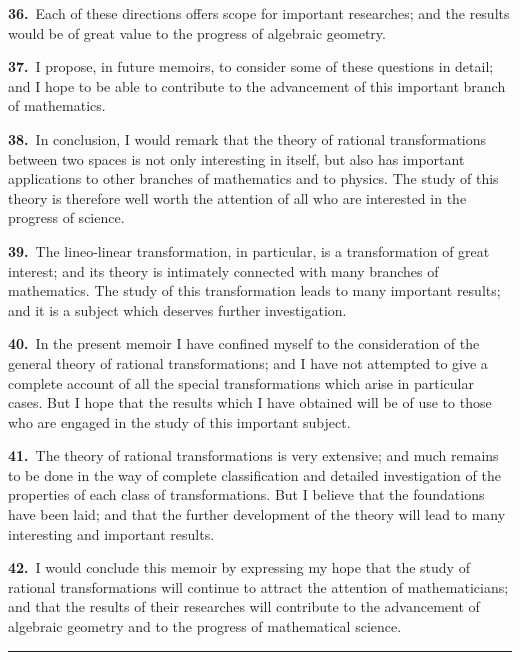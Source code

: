 \documentclass[11pt,a4paper]{article}
\begin{document}
\textbf{36.}\ Each of these directions offers scope for important researches; and the results would be of great value to the progress of algebraic geometry.

\newpage
\setcounter{page}{199}

\noindent\textbf{37.}\ I propose, in future memoirs, to consider some of these questions in detail; and I hope to be able to contribute to the advancement of this important branch of mathematics.

\textbf{38.}\ In conclusion, I would remark that the theory of rational transformations between two spaces is not only interesting in itself, but also has important applications to other branches of mathematics and to physics. The study of this theory is therefore well worth the attention of all who are interested in the progress of science.

\textbf{39.}\ The lineo-linear transformation, in particular, is a transformation of great interest; and its theory is intimately connected with many branches of mathematics. The study of this transformation leads to many important results; and it is a subject which deserves further investigation.

\textbf{40.}\ In the present memoir I have confined myself to the consideration of the general theory of rational transformations; and I have not attempted to give a complete account of all the special transformations which arise in particular cases. But I hope that the results which I have obtained will be of use to those who are engaged in the study of this important subject.

\newpage
\setcounter{page}{200}

\noindent\textbf{41.}\ The theory of rational transformations is very extensive; and much remains to be done in the way of complete classification and detailed investigation of the properties of each class of transformations. But I believe that the foundations have been laid; and that the further development of the theory will lead to many interesting and important results.

\textbf{42.}\ I would conclude this memoir by expressing my hope that the study of rational transformations will continue to attract the attention of mathematicians; and that the results of their researches will contribute to the advancement of algebraic geometry and to the progress of mathematical science.

\vspace{2em}
\begin{center}
\rule{0.5\textwidth}{0.4pt}
\end{center}
\end{document}
